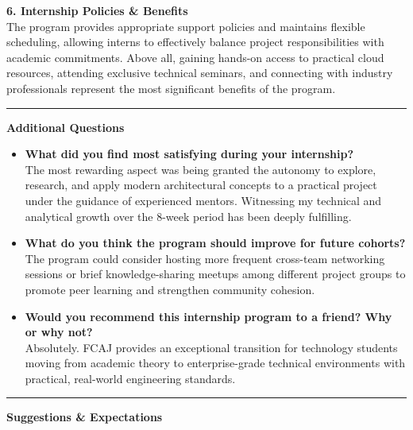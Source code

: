 \textbf{6. Internship Policies \& Benefits}\\
The program provides appropriate support policies and maintains flexible
scheduling, allowing interns to effectively balance project
responsibilities with academic commitments. Above all, gaining hands-on
access to practical cloud resources, attending exclusive technical
seminars, and connecting with industry professionals represent the most
significant benefits of the program.

\begin{center}\rule{0.5\linewidth}{0.5pt}\end{center}

\vspace{0.5em}\noindent\textbf{Additional Questions}

\begin{itemize}
\item
  \textbf{What did you find most satisfying during your internship?}\\
  The most rewarding aspect was being granted the autonomy to explore,
  research, and apply modern architectural concepts to a practical
  project under the guidance of experienced mentors. Witnessing my
  technical and analytical growth over the 8-week period has been deeply
  fulfilling.
\item
  \textbf{What do you think the program should improve for future
  cohorts?}\\
  The program could consider hosting more frequent cross-team networking
  sessions or brief knowledge-sharing meetups among different project
  groups to promote peer learning and strengthen community cohesion.
\item
  \textbf{Would you recommend this internship program to a friend? Why
  or why not?}\\
  Absolutely. FCAJ provides an exceptional transition for technology
  students moving from academic theory to enterprise-grade technical
  environments with practical, real-world engineering standards.
\end{itemize}

\begin{center}\rule{0.5\linewidth}{0.5pt}\end{center}

\vspace{0.5em}\noindent\textbf{Suggestions \& Expectations}

